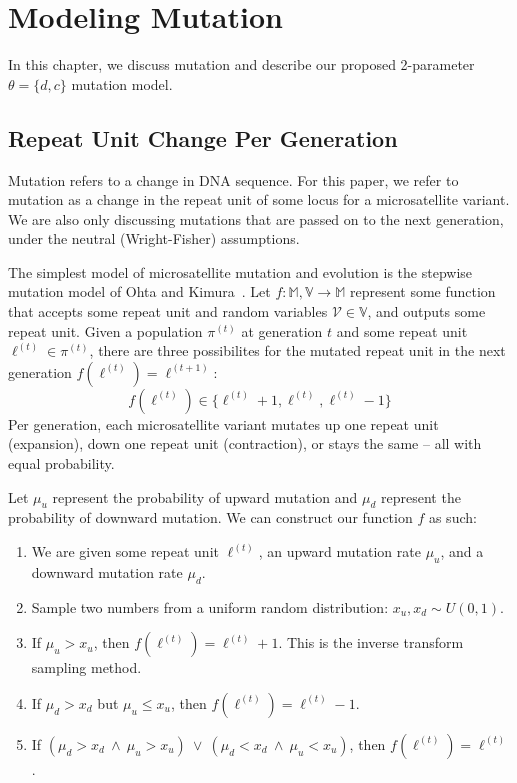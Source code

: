 \chapter{Modeling Mutation}\label{ch:modelingMutation}
In this chapter, we discuss mutation and describe our proposed 2-parameter $\theta = \{ d, c\}$ mutation model.

\section{Repeat Unit Change Per Generation}\label{sec:repeatUnitChangePerGeneration}
Mutation refers to a change in DNA sequence.
For this paper, we refer to mutation as a change in the repeat unit of some locus for a microsatellite variant.
We are also only discussing mutations that are passed on to the next generation, under the neutral (Wright-Fisher)
assumptions.

The simplest model of microsatellite mutation and evolution is the stepwise mutation
model of Ohta and Kimura~\cite{ohtaModelMutationAppropriate2007}.
Let $f : \mathbb{M},\mathbb{V} \rightarrow \mathbb{M}$ represent some function that accepts some repeat unit and random
variables $\mathcal{V} \in \mathbb{V}$, and outputs some repeat unit.
Given a population $\pi^{(t)}$ at generation $t$ and some repeat unit $\ell^{(t)} \in \pi^{(t)}$, there are three
possibilites for the mutated repeat unit in the next generation $f(\ell^{(t)}) = \ell^{(t+1)}$:
\begin{equation}
    f(\ell^{(t)}) \in \{ \ell^{(t)} + 1 , \ell^{(t)}, \ell^{(t)} - 1\}
\end{equation}
Per generation, each microsatellite variant mutates up one repeat unit (expansion), down one repeat unit
(contraction), or stays the same -- all with equal probability.

Let $\mu_u$ represent the probability of upward mutation and $\mu_d$ represent the probability of downward mutation.
We can construct our function $f$ as such:
\begin{enumerate}
    \item We are given some repeat unit $\ell^{(t)}$, an upward mutation rate $\mu_u$, and a
        downward mutation rate $\mu_d$.
    \item Sample two numbers from a uniform random distribution: $x_u, x_d \sim U(0, 1)$.
    \item If $\mu_u > x_u$, then $f(\ell^{(t)}) = \ell^{(t)} + 1$.
        This is the inverse transform sampling method. \label{enum:um}
    \item If $\mu_d > x_d$ but $\mu_u \leq x_u$, then $f(\ell^{(t)}) = \ell^{(t)} - 1$. \label{enum:dm}
    \item If $(\mu_d > x_d \ \land \ \mu_u > x_u) \ \lor \ (\mu_d < x_d \ \land \ \mu_u < x_u)$, then
        $f(\ell^{(t)}) = \ell^{(t)}$.
\end{enumerate}


